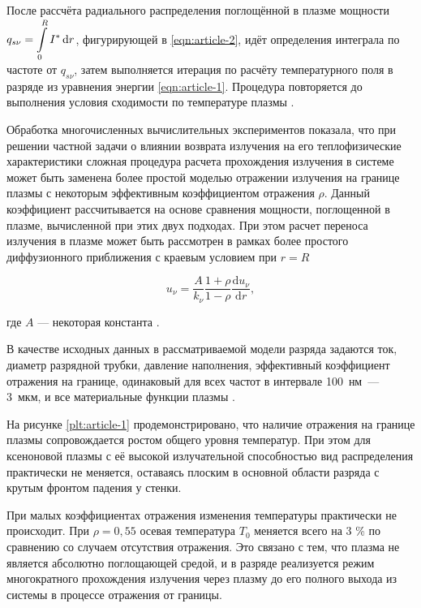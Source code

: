 После рассчёта радиального распределения поглощённой в плазме мощности $\displaystyle q_{s\nu} = \int\displaylimits_0^R I^* \,\mathrm dr$, фигурирующей в \eqref{eqn:article-2},  идёт определения интеграла по частоте от $q_{s\nu}$, затем выполняется итерация по расчёту температурного поля в разряде из уравнения энергии \eqref{eqn:article-1}.
Процедура повторяется до выполнения условия сходимости по температуре плазмы \cite{article-5-kalitkin}.

Обработка многочисленных вычислительных экспериментов \cite{gradov-dissertation, article-6-gradov} показала, что при решении частной задачи о влиянии возврата излучения на его теплофизические характеристики сложная процедура расчета прохождения излучения в системе может быть заменена более простой моделью отражении излучения на границе плазмы с некоторым эффективным коэффициентом отражения $\rho$.
Данный коэффициент рассчитывается на основе сравнения мощности, поглощенной в плазме, вычисленной при этих двух подходах.
При этом расчет переноса излучения в плазме может быть рассмотрен в рамках более простого диффузионного приближения \cite{gradov-dissertation, article-6-gradov, article-7-zeldovich} с краевым условием при $r = R$

\begin{equation}
	u_\nu = \frac{A}{k_\nu} \frac{1 + \rho}{1 - \rho} \frac{\mathrm du_\nu}{\mathrm dr},
\end{equation}

\noindent где $A$ — некоторая константа \cite{gradov-dissertation, article-6-gradov}.

В качестве исходных данных в рассматриваемой модели разряда задаются ток, диаметр разрядной трубки, давление наполнения, эффективный коэффициент отражения на границе, одинаковый для всех частот в интервале 100~нм~— 3~мкм, и все материальные функции плазмы \cite{article-8-gradov, article-9-gradov}.

На рисунке \ref{plt:article-1} продемонстрировано, что наличие отражения на границе плазмы сопровождается ростом общего уровня температур.
При этом для ксеноновой плазмы с её высокой излучательной способностью вид распределения практически не меняется, оставаясь плоским в основной области разряда с крутым фронтом падения у стенки.

При малых коэффициентах отражения изменения температуры практически не происходит.
При $\rho = 0,55$ осевая температура $T_0$ меняется всего на 3 \% по сравнению со случаем отсутствия отражения.
Это связано с тем, что плазма не является абсолютно поглощающей средой, и в разряде реализуется режим многократного прохождения излучения через плазму до его полного выхода из системы в процессе отражения от границы.

